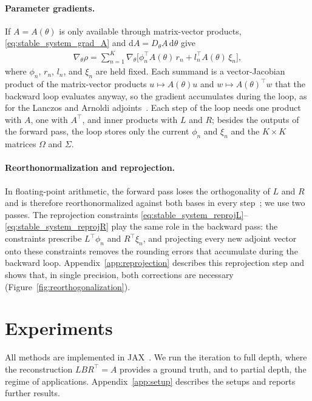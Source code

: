 \documentclass[a4paper,12pt]{article}
\theoremstyle{definition}
\begin{document}
\paragraph{Parameter gradients.}
If $A = A(\theta)$ is only available through matrix-vector products, \eqref{eq:stable_system_grad_A} and $\mathrm{d}A = D_\theta A\, \mathrm{d}\theta$ give
\begin{align}
    \nabla_\theta \rho = \sum_{n=1}^{K} \nabla_\theta \big[\phi_n^\top A(\theta)\, r_n + l_n^\top A(\theta)\, \xi_n\big], \label{eq:stable_system_grad_theta}
\end{align}
where $\phi_n$, $r_n$, $l_n$, and $\xi_n$ are held fixed. Each summand is a vector-Jacobian product of the matrix-vector products $u \mapsto A(\theta) u$ and $w \mapsto A(\theta)^\top w$ that the backward loop evaluates anyway, so the gradient accumulates during the loop, as for the Lanczos and Arnoldi adjoints~\citep[Corollary~4.3]{kraemer2024gradients}. Each step of the loop needs one product with $A$, one with $A^\top$, and inner products with $L$ and $R$; besides the outputs of the forward pass, the loop stores only the current $\phi_n$ and $\xi_n$ and the $K \times K$ matrices $\Omega$ and $\Sigma$.

\paragraph{Reorthonormalization and reprojection.}
In floating-point arithmetic, the forward pass loses the orthogonality of $L$ and $R$ and is therefore reorthonormalized against both bases in every step~\citep{golub2013matrix}; we use two passes. The reprojection constraints \eqref{eq:stable_system_reprojL}--\eqref{eq:stable_system_reprojR} play the same role in the backward pass: the constraints prescribe $L^\top \phi_n$ and $R^\top \xi_n$, and projecting every new adjoint vector onto these constraints removes the rounding errors that accumulate during the backward loop. Appendix~\ref{app:reprojection} describes this reprojection step and shows that, in single precision, both corrections are necessary (Figure~\ref{fig:reorthogonalization}).

\section{Experiments}\label{sec:experiments}
All methods are implemented in JAX~\citep{jax2018github}. We run the iteration to full depth, where the reconstruction $LBR^\top = A$ provides a ground truth, and to partial depth, the regime of applications. Appendix~\ref{app:setup} describes the setups and reports further results.
\end{document}
